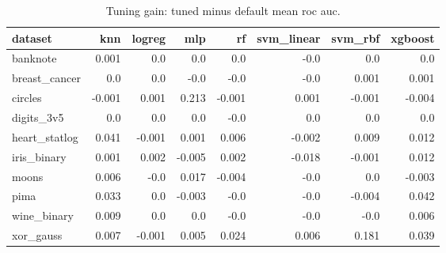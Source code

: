 \begin{table}[ht]
\centering
\caption{Tuning gain: tuned minus default mean roc auc.}
\label{tab:e1-delta-roc_auc}
\begin{tabular}{lrrrrrrr}
\toprule
dataset & knn & logreg & mlp & rf & svm\_linear & svm\_rbf & xgboost \\
\midrule
banknote & 0.001 & 0.0 & 0.0 & 0.0 & -0.0 & 0.0 & 0.0 \\
breast\_cancer & 0.0 & 0.0 & -0.0 & -0.0 & -0.0 & 0.001 & 0.001 \\
circles & -0.001 & 0.001 & 0.213 & -0.001 & 0.001 & -0.001 & -0.004 \\
digits\_3v5 & 0.0 & 0.0 & 0.0 & -0.0 & 0.0 & 0.0 & 0.0 \\
heart\_statlog & 0.041 & -0.001 & 0.001 & 0.006 & -0.002 & 0.009 & 0.012 \\
iris\_binary & 0.001 & 0.002 & -0.005 & 0.002 & -0.018 & -0.001 & 0.012 \\
moons & 0.006 & -0.0 & 0.017 & -0.004 & -0.0 & 0.0 & -0.003 \\
pima & 0.033 & 0.0 & -0.003 & -0.0 & -0.0 & -0.004 & 0.042 \\
wine\_binary & 0.009 & 0.0 & 0.0 & -0.0 & -0.0 & -0.0 & 0.006 \\
xor\_gauss & 0.007 & -0.001 & 0.005 & 0.024 & 0.006 & 0.181 & 0.039 \\
\bottomrule
\end{tabular}
\end{table}
